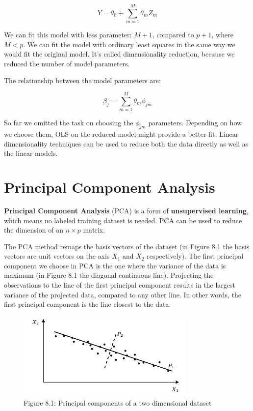 \[Y = \theta_0 + \sum_{m=1}^M\theta_mZ_m\]

We can fit this model with less parameter: \(M + 1\), compared to \(p + 1\), where \(M < p\). We can fit the model with ordinary least squares in the same way we would fit the original model. It's called dimensionality reduction, because we reduced the number of model parameters.

The relationship between the model parameters are:

\[\beta_j = \sum_{m = 1}^M\theta_m \phi_{jm}\]

So far we omitted the task on choosing the \(\phi_{jm}\) parameters. Depending on how we choose them, OLS on the reduced model might provide a better fit. Linear dimensionality techniques can be used to reduce both the data directly as well as the linear models.

\section{Principal Component Analysis}

\textbf{Principal Component Analysis} (PCA) is a form of \textbf{unsupervised learning}, which means no labeled training dataset is needed. PCA can be used to reduce the dimension of an \(n \times p\) matrix.

The PCA method remaps the basis vectors of the dataset (in Figure 8.1 the basis vectors are unit vectors on the axis \(X_1\) and \(X_2\) respectively). The first principal component we choose in PCA is the one where the variance of the data is maximum (in Figure 8.1 the diagonal continuous line). Projecting the observations to the line of the first principal component results in the largest variance of the projected data, compared to any other line. In other words, the first principal component is the line closest to the data.


\begin{figure}[htbp]
    \begin{center}
        \includegraphics[width=250pt]{../img/08-principal-component.png}
        \caption{Figure 8.1:  Principal components of a two dimensional dataset}
    \end{center}
\end{figure}


